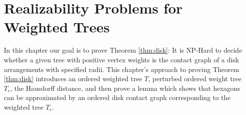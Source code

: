 \chapter{Realizability Problems for Weighted Trees}\label{chp:disk}

In this chapter our goal is to prove Theorem \ref{thm:disk}: It is NP-Hard to decide whether a given tree with positive vertex weights is the contact graph of a disk arrangements with specified radii.   
This chapter's approach to proving Theorem \ref{thm:disk} introduces an ordered weighted tree $T$, perturbed ordered weight tree $T_\epsilon$, the Hausdorff distance, and then prove a lemma which shows that hexagons can be approximated by an ordered disk contact graph corresponding to the weighted tree $T_\epsilon$.
